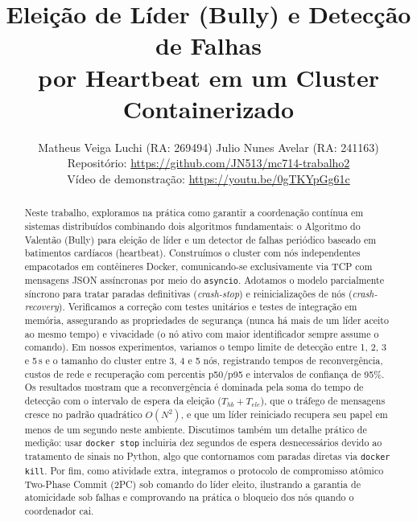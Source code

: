\documentclass[journal]{IEEEtran}
\begin{document}
\title{Eleição de Líder (Bully) e Detecção de Falhas\\por Heartbeat em um Cluster Containerizado}

\author{Matheus Veiga Luchi (RA: 269494) \qquad Julio Nunes Avelar (RA: 241163)\\[0.4em]
\small Repositório: \url{https://github.com/JN513/mc714-trabalho2}\\[0.15em]
\small Vídeo de demonstração: \url{https://youtu.be/0gTKYpGg61c}}


\maketitle

\begin{abstract}
Neste trabalho, exploramos na prática como garantir a coordenação contínua em sistemas distribuídos combinando dois algoritmos fundamentais: o Algoritmo do Valentão (Bully) para eleição de líder e um detector de falhas periódico baseado em batimentos cardíacos (heartbeat). Construímos o cluster com nós independentes empacotados em contêineres Docker, comunicando-se exclusivamente via TCP com mensagens JSON assíncronas por meio do \texttt{asyncio}. Adotamos o modelo parcialmente síncrono para tratar paradas definitivas (\emph{crash-stop}) e reinicializações de nós (\emph{crash-recovery}). Verificamos a correção com testes unitários e testes de integração em memória, assegurando as propriedades de segurança (nunca há mais de um líder aceito ao mesmo tempo) e vivacidade (o nó ativo com maior identificador sempre assume o comando). Em nossos experimentos, variamos o tempo limite de detecção entre 1, 2, 3 e 5\,s e o tamanho do cluster entre 3, 4 e 5 nós, registrando tempos de reconvergência, custos de rede e recuperação com percentis p50/p95 e intervalos de confiança de 95\%. Os resultados mostram que a reconvergência é dominada pela soma do tempo de detecção com o intervalo de espera da eleição ($T_{hb}+T_{ele}$), que o tráfego de mensagens cresce no padrão quadrático $O(N^2)$, e que um líder reiniciado recupera seu papel em menos de um segundo neste ambiente. Discutimos também um detalhe prático de medição: usar \texttt{docker stop} incluiria dez segundos de espera desnecessários devido ao tratamento de sinais no Python, algo que contornamos com paradas diretas via \texttt{docker kill}. Por fim, como atividade extra, integramos o protocolo de compromisso atômico Two-Phase Commit (2PC) sob comando do líder eleito, ilustrando a garantia de atomicidade sob falhas e comprovando na prática o bloqueio dos nós quando o coordenador cai.
\end{abstract}
\end{document}

